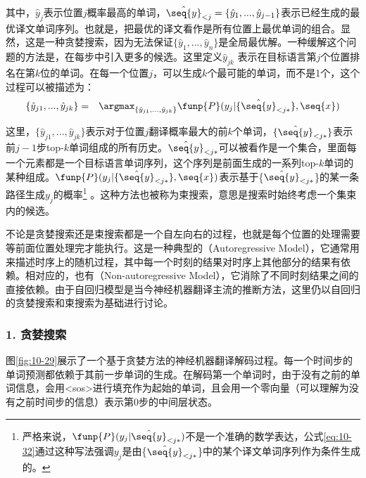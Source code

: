 \noindent 其中，$\hat{y}_j$表示位置$j$概率最高的单词，$\hat{\seq{{y}}}_{<j} = \{ \hat{y}_1,...,\hat{y}_{j-1} \}$表示已经生成的最优译文单词序列。也就是，把最优的译文看作是所有位置上最优单词的组合。显然，这是一种贪婪搜索，因为无法保证$\{ \hat{y}_1,...,\hat{y}_{n} \}$是全局最优解。一种缓解这个问题的方法是，在每步中引入更多的候选。这里定义$\hat{y}_{jk} $ 表示在目标语言第$j$个位置排名在第$k$位的单词。在每一个位置$j$，可以生成$k$个最可能的单词，而不是1个，这个过程可以被描述为：
\begin{eqnarray}
\{ \hat{y}_{j1},...,\hat{y}_{jk} \} &=& \argmax_{ \{ \hat{y}_{j1},...,\hat{y}_{jk} \} }
\funp{P}(y_j | \{ \hat{\seq{{y}}}_{<{j\ast}} \},\seq{{x}})
\label{eq:10-32}
\end{eqnarray}

\noindent 这里，$\{ \hat{y}_{j1},...,\hat{y}_{jk} \}$表示对于位置$j$翻译概率最大的前$k$个单词，$\{ \hat{\seq{{y}}}_{<j\ast} \}$表示前$j-1$步top-$k$单词组成的所有历史。${\hat{\seq{{y}}}_{<j\ast}}$可以被看作是一个集合，里面每一个元素都是一个目标语言单词序列，这个序列是前面生成的一系列top-$k$单词的某种组成。$\funp{P}(y_j | \{ \hat{\seq{{y}}}_{<{j\ast}} \},\seq{{x}})$表示基于\{$ \hat{\seq{{y}}}_{<j\ast} $\}的某一条路径生成$y_j$的概率\footnote{严格来说，$ \funp{P} (y_j | {\hat{\seq{{y}}}_{<j\ast} })$不是一个准确的数学表达，公式\eqref{eq:10-32}通过这种写法强调$y_j$是由\{$ \hat{\seq{{y}}}_{<j\ast} $\}中的某个译文单词序列作为条件生成的。} 。这种方法也被称为束搜索，意思是搜索时始终考虑一个集束内的候选。

\parinterval 不论是贪婪搜索还是束搜索都是一个自左向右的过程，也就是每个位置的处理需要等前面位置处理完才能执行。这是一种典型的{\small{}}（Autoregressive Model），它通常用来描述时序上的随机过程，其中每一个时刻的结果对时序上其他部分的结果有依赖。相对应的，也有{\small{}}（Non-autoregressive Model），它消除了不同时刻结果之间的直接依赖。由于自回归模型是当今神经机器翻译主流的推断方法，这里仍以自回归的贪婪搜索和束搜索为基础进行讨论。

\vspace{1.0em}
\subsubsection{1. 贪婪搜索}
\vspace{0.6em}
\parinterval 图\ref{fig:10-29}展示了一个基于贪婪方法的神经机器翻译解码过程。每一个时间步的单词预测都依赖于其前一步单词的生成。在解码第一个单词时，由于没有之前的单词信息，会用<sos>进行填充作为起始的单词，且会用一个零向量（可以理解为没有之前时间步的信息）表示第0步的中间层状态。
\vspace{0.8em}

